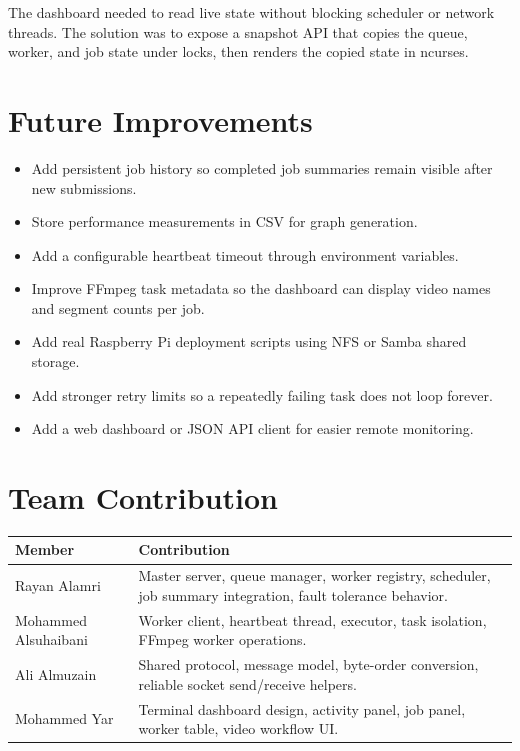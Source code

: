 \documentclass[12pt,a4paper]{article}
\begin{document}
The dashboard needed to read live state without blocking scheduler or network threads. The solution was to expose a snapshot API that copies the queue, worker, and job state under locks, then renders the copied state in ncurses.

\section{Future Improvements}

\begin{itemize}[noitemsep]
    \item Add persistent job history so completed job summaries remain visible after new submissions.
    \item Store performance measurements in CSV for graph generation.
    \item Add a configurable heartbeat timeout through environment variables.
    \item Improve FFmpeg task metadata so the dashboard can display video names and segment counts per job.
    \item Add real Raspberry Pi deployment scripts using NFS or Samba shared storage.
    \item Add stronger retry limits so a repeatedly failing task does not loop forever.
    \item Add a web dashboard or JSON API client for easier remote monitoring.
\end{itemize}

\section{Team Contribution}

\begin{center}
\begin{tabular}{p{4cm}p{9cm}}
\toprule
\textbf{Member} & \textbf{Contribution} \\
\midrule
Rayan Alamri & Master server, queue manager, worker registry, scheduler, job summary integration, fault tolerance behavior. \\
Mohammed Alsuhaibani & Worker client, heartbeat thread, executor, task isolation, FFmpeg worker operations. \\
Ali Almuzain & Shared protocol, message model, byte-order conversion, reliable socket send/receive helpers. \\
Mohammed Yar & Terminal dashboard design, activity panel, job panel, worker table, video workflow UI. \\
\bottomrule
\end{tabular}
\end{center}
\end{document}
